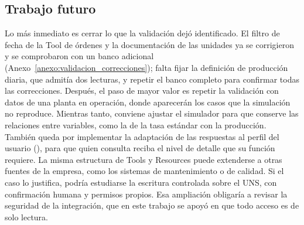 \subsection{Trabajo futuro}

Lo más inmediato es cerrar lo que la validación dejó identificado. El filtro de fecha de la Tool de órdenes y la documentación de las unidades ya se corrigieron y se comprobaron con un banco adicional (Anexo~\ref{anexo:validacion_correcciones}); falta fijar la definición de producción diaria, que admitía dos lecturas, y repetir el banco completo para confirmar todas las correcciones. Después, el paso de mayor valor es repetir la validación con datos de una planta en operación, donde aparecerán los casos que la simulación no reproduce. Mientras tanto, conviene ajustar el simulador para que conserve las relaciones entre variables, como la de la tasa estándar con la producción. También queda por implementar la adaptación de las respuestas al perfil del usuario (), para que quien consulta reciba el nivel de detalle que su función requiere. La misma estructura de Tools y Resources puede extenderse a otras fuentes de la empresa, como los sistemas de mantenimiento o de calidad. Si el caso lo justifica, podría estudiarse la escritura controlada sobre el UNS, con confirmación humana y permisos propios. Esa ampliación obligaría a revisar la seguridad de la integración, que en este trabajo se apoyó en que todo acceso es de solo lectura.
